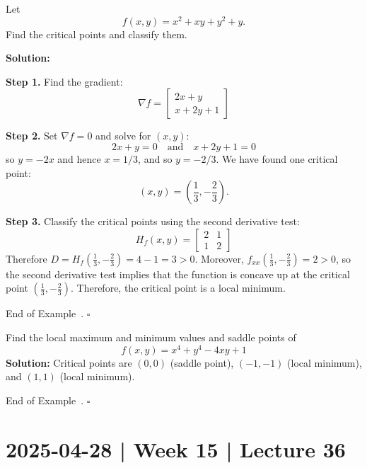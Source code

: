 \documentclass[10pt]{article}
\theoremstyle{definition}
\newtheorem{example}[theorem]{Example}
\renewenvironment{example}
{\begin{oldexample}}
  {\par\smallskip\hfill   End of Example~\theexample. $\square$    \par\end{oldexample}}
\newcommand{\vt}{\vskip 5mm} %
\newcommand{\fl}{\noindent\textbf} %
\newcommand{\Fl}{\vt\noindent\textbf} %
\newcommand{\1}[1]{\textbf{1}_{\left[#1\right]}} %
\begin{document}
\begin{example}
  Let
  \begin{equation*}
    f(x,y) = x^{2}+xy+y^{2}+y.
  \end{equation*}
  Find the critical points and classify them.

  \Fl{Solution:}

  \fl{Step 1.} Find the gradient:
  \begin{equation*}
    \nabla f =
    \begin{bmatrix}
      2x+y\\x+2y+1
    \end{bmatrix}
  \end{equation*}

  \fl{Step 2.} Set $\nabla f=0$ and solve for $(x,y)$:
  \begin{equation*}
    2x+y=0 \quad \text{and} \quad x+2y+1=0
  \end{equation*}
  so $y=-2x$ and hence $x=1/3$, and so $y=-2/3$.
  We have found one critical point:
  \begin{equation*}
    (x,y) = (\frac{1}{3},-\frac{2}{3}).
  \end{equation*}

  \fl{Step 3.} Classify the critical points using the second derivative test:
  \begin{equation*}
    H_{f}(x,y) =
    \begin{bmatrix}
      2&1\\1&2
    \end{bmatrix}
  \end{equation*}
  Therefore $D = H_{f}(\frac{1}{3},-\frac{2}{3})= 4-1 = 3>0$. Moreover,
  $f_{xx}(\frac{1}{3},-\frac{2}{3}) = 2>0$, so the second derivative test
  implies that the function is concave up at the critical point
  $(\frac{1}{3},-\frac{2}{3})$. Therefore, the critical point is a local minimum.
\end{example}


\begin{example}
  Find the local maximum and minimum values and saddle points of
  \begin{equation*}
    f(x,y) = x^{4}+y^{4}-4xy+1
  \end{equation*}
  \fl{Solution:} Critical points are $(0,0)$ (saddle point), $(-1,-1)$
  (local minimum), and $(1,1)$ (local minimum).
\end{example}


\section{2025-04-28 | Week 15 | Lecture 36}
\end{document}
